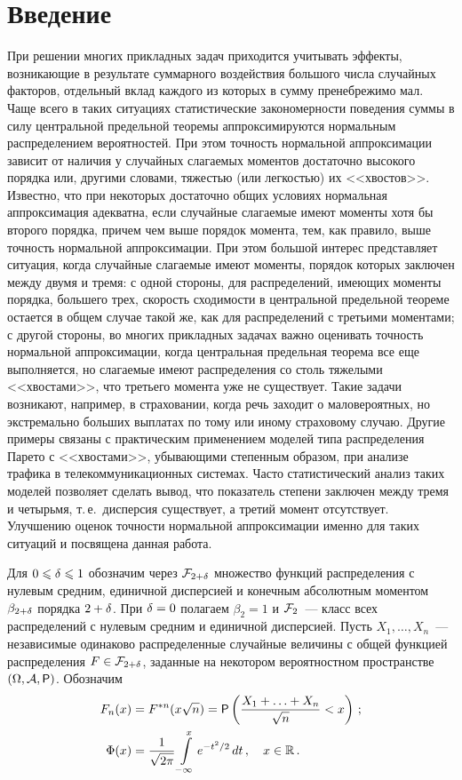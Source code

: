       \begin{multicols}{2}

      \label{st\stat}
  

\section{Введение}

При решении многих прикладных задач приходится учитывать эффекты,
возникающие в результате суммарного воздействия большого числа
случайных факторов, отдельный вклад каждого из которых в сумму
пренебрежимо мал. Чаще всего в таких ситуациях статистические
закономерности поведения суммы в силу центральной предельной теоремы
аппроксимируются нормальным распределением вероятностей. При этом
точность нормальной аппроксимации зависит от наличия у случайных
слагаемых моментов достаточно высокого порядка или, другими
словами, тяжестью (или легкостью) их <<хвостов>>. Известно, что при
некоторых достаточно общих условиях нормальная аппроксимация
адекватна, если случайные слагаемые имеют моменты хотя бы второго
порядка, причем чем выше порядок момента, тем, как правило, выше
точность нормальной аппроксимации. При этом большой интерес
представляет ситуация, когда случайные слагаемые имеют моменты,
порядок которых заключен между двумя и тремя: с одной стороны, для
распределений, имеющих моменты порядка, большего трех, скорость
сходимости в центральной предельной теореме остается в общем случае
такой же, как для распределений с третьими моментами; с другой
стороны, во многих прикладных задачах важно оценивать точность
нормальной аппроксимации, когда центральная предельная теорема все
еще выполняется, но слагаемые имеют распределения со столь тяжелыми
<<хвостами>>, что третьего момента уже не существует. Такие задачи
возникают, например, в страховании, когда речь заходит о
маловероятных, но экстремально больших выплатах по тому или иному
страховому случаю. Другие примеры связаны с практическим применением
моделей типа распределения Парето с <<хвостами>>, убывающими степенным
образом, при анализе трафика в телекоммуникационных сис\-те\-мах. Часто
статистический анализ таких моделей позволяет сделать вывод, что
показатель степени заключен между тремя и четырьмя, т.\,е.\
дисперсия существует, а третий момент отсутствует. Улучшению оценок
точности нормальной аппроксимации именно для таких ситуаций и
посвящена данная работа.

Для $0\leqslant\delta\leqslant 1$ обозначим через ${\mathcal F}_{2+\delta}$ множество функций
распределения с нулевым средним, единичной дисперсией и конечным
абсолютным моментом $\beta_{2+\delta}$ порядка ${2+\delta}$. При $\delta=0$ полагаем
$\beta_2=1$ и ${\mathcal F}_2$~--- класс всех распределений с нулевым средним и
единичной дисперсией. Пусть $X_1,\ldots,X_n$~--- независимые
одинаково распределенные случайные величины с общей функцией
распределения $F\in{\mathcal F}_{2+\delta}$, заданные на некотором вероятностном
пространстве $(\Omega,\mathcal{A},{\sf P})$. Обозначим
\begin{align*}
F_n(x)&=F^{*n}(x\sqrt{n})=
{\sf P}\left(\displaystyle\frac{\displaystyle X_1+\ldots+X_n\mathstrut}{\displaystyle \sqrt{n}\mathstrut}<x\right)\,;
\\
\Phi(x)&=\displaystyle\frac{\displaystyle 1\mathstrut}{\displaystyle \sqrt{2\pi}\mathstrut}\int\limits_{-\infty}^xe^{-t^2/2}\,dt\,,\quad
x\in\mathbb R\,.
\end{align*}


\end{multicols}
